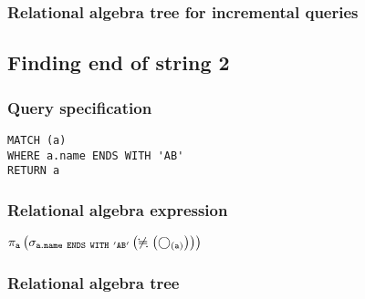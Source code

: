 \subsubsection*{Relational algebra tree for incremental queries}


\subsection{Finding end of string 2}

\subsubsection*{Query specification}

\begin{lstlisting}
MATCH (a)
WHERE a.name ENDS WITH 'AB'
RETURN a
\end{lstlisting}

\subsubsection*{Relational algebra expression}

$\projection{\var{a}} \left(\selection{\mathtt{a.name~ENDS~WITH~'AB'}} \left(\alldifferent{} \left(\getvertices{a}{}\right)\right)\right)$

\subsubsection*{Relational algebra tree}


